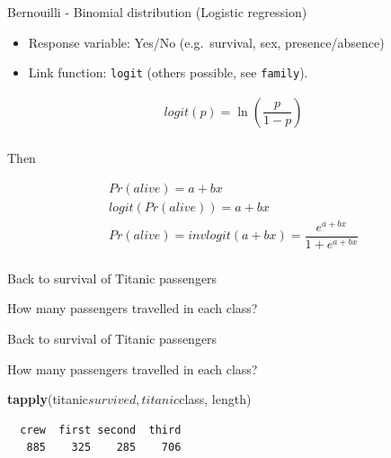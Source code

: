 \documentclass[10pt,ignorenonframetext,]{beamer}
\newenvironment{Shaded}{\begin{snugshade}}{\end{snugshade}}
\newcommand{\KeywordTok}[1]{\textcolor[rgb]{0.13,0.29,0.53}{\textbf{{#1}}}}
\newcommand{\NormalTok}[1]{{#1}}
\providecommand{\tightlist}{%
\setlength{\itemsep}{0pt}\setlength{\parskip}{0pt}}
\begin{document}
\begin{frame}[fragile]{Bernouilli - Binomial distribution (Logistic
regression)}

\begin{itemize}[<+->]
\tightlist
\item
  Response variable: Yes/No (e.g.~survival, sex, presence/absence)
\item
  Link function: \texttt{logit} (others possible, see \texttt{family}).
\end{itemize}

\[
  \begin{aligned} 
  logit(p) = \ln \left( \dfrac {p} {1-p}\right) \\ 
  \end{aligned} 
\]

Then

\[
  \begin{aligned} 
  Pr(alive) = a + bx \\  
  logit(Pr(alive)) = a + bx \\  
  Pr(alive) = invlogit(a + bx) = \dfrac {e^{a+bx}} {1+e^{a+bx}} \\  
  \end{aligned} 
\]

\end{frame}

\begin{frame}{Back to survival of Titanic passengers}

How many passengers travelled in each class?

\end{frame}

\begin{frame}[fragile]{Back to survival of Titanic passengers}

How many passengers travelled in each class?

\begin{Shaded}
\begin{Highlighting}[]
\KeywordTok{tapply}\NormalTok{(titanic$survived, titanic$class, length)}
\end{Highlighting}
\end{Shaded}

\begin{verbatim}
  crew  first second  third 
   885    325    285    706 
\end{verbatim}

\end{frame}
\end{document}
